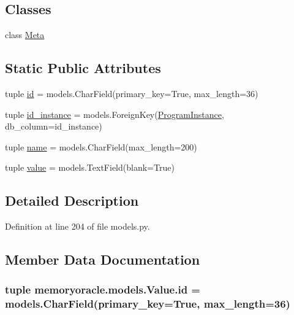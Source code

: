 \subsection*{Classes}
\begin{DoxyCompactItemize}
\item 
class \hyperlink{classmemoryoracle_1_1models_1_1Value_1_1Meta}{Meta}
\end{DoxyCompactItemize}
\subsection*{Static Public Attributes}
\begin{DoxyCompactItemize}
\item 
tuple \hyperlink{classmemoryoracle_1_1models_1_1Value_ab4415034ffad590395df44f5fe582fae}{id} = models.\+Char\+Field(primary\+\_\+key=True, max\+\_\+length=36)
\item 
tuple \hyperlink{classmemoryoracle_1_1models_1_1Value_a68f30f290c29fda843570179c1a16b14}{id\+\_\+instance} = models.\+Foreign\+Key(\hyperlink{classmemoryoracle_1_1models_1_1ProgramInstance}{Program\+Instance}, db\+\_\+column=\textquotesingle{}id\+\_\+instance\textquotesingle{})
\item 
tuple \hyperlink{classmemoryoracle_1_1models_1_1Value_aeb0e8d35b51e2b0b579d6ded9de432eb}{name} = models.\+Char\+Field(max\+\_\+length=200)
\item 
tuple \hyperlink{classmemoryoracle_1_1models_1_1Value_a7f23da89c776a06cd9c84754ac455295}{value} = models.\+Text\+Field(blank=True)
\end{DoxyCompactItemize}


\subsection{Detailed Description}


Definition at line 204 of file models.\+py.



\subsection{Member Data Documentation}
\hypertarget{classmemoryoracle_1_1models_1_1Value_ab4415034ffad590395df44f5fe582fae}{}
\subsubsection[{id}]{\setlength{\rightskip}{0pt plus 5cm}tuple memoryoracle.\+models.\+Value.\+id = models.\+Char\+Field(primary\+\_\+key=True, max\+\_\+length=36)\hspace{0.3cm}{\ttfamily [static]}}\label{classmemoryoracle_1_1models_1_1Value_ab4415034ffad590395df44f5fe582fae}


